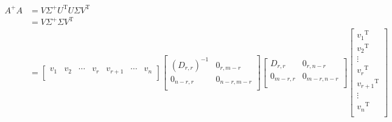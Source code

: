 \documentclass{article}      %
\DeclareMathOperator{\TextTranspose}{T}
\newcommand{\transpose}[1]{{{#1}^{\TextTranspose}}}
\begin{document}
\begin{align*}
A^{+} A 
&= V \Sigma^{+} \transpose{U} U \Sigma \transpose{V} \\
&= V \Sigma^{+} \Sigma \transpose{V} \\
&=
\begin{bmatrix}
v_1 & v_2 & \cdots & v_r & v_{r+1} & \cdots & v_n \\
\end{bmatrix}
\begin{bmatrix}
(D_{r,r})^{-1} & 0_{r,m-r} \\
0_{n-r,r} & 0_{n-r,m-r} \\
\end{bmatrix}
\begin{bmatrix}
D_{r,r} & 0_{r,n-r} \\
0_{m-r,r} & 0_{m-r,n-r} \\
\end{bmatrix}
\begin{bmatrix}
\transpose{v_1} \\ \transpose{v_2} \\ \vdots \\ \transpose{v_r} \\ \transpose{v_{r+1}} \\ \vdots \\ \transpose{v_n} \\
\end{bmatrix}
\end{align*}
\end{document}
